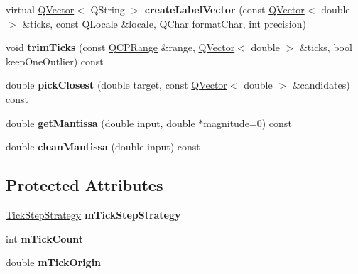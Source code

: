 \begin{DoxyCompactItemize}
virtual \hyperlink{class_q_vector}{Q\+Vector}$<$ Q\+String $>$ {\bfseries create\+Label\+Vector} (const \hyperlink{class_q_vector}{Q\+Vector}$<$ double $>$ \&ticks, const Q\+Locale \&locale, Q\+Char format\+Char, int precision)
\item 
\mbox{\label{class_q_c_p_axis_ticker_ab28cc1ab549489be7975f5ce7e717916}} 
void {\bfseries trim\+Ticks} (const \hyperlink{class_q_c_p_range}{Q\+C\+P\+Range} \&range, \hyperlink{class_q_vector}{Q\+Vector}$<$ double $>$ \&ticks, bool keep\+One\+Outlier) const
\item 
\mbox{\label{class_q_c_p_axis_ticker_a4ea0a7c4ca1c610f92b9bd5944ab4260}} 
double {\bfseries pick\+Closest} (double target, const \hyperlink{class_q_vector}{Q\+Vector}$<$ double $>$ \&candidates) const
\item 
\mbox{\label{class_q_c_p_axis_ticker_a2f1e223bafbf2cec7c3ba8b08d5c77e8}} 
double {\bfseries get\+Mantissa} (double input, double $\ast$magnitude=0) const
\item 
\mbox{\label{class_q_c_p_axis_ticker_ac7df6c72876b7abd67c932663a0b0f6a}} 
double {\bfseries clean\+Mantissa} (double input) const
\end{DoxyCompactItemize}
\subsection*{Protected Attributes}
\begin{DoxyCompactItemize}
\item 
\mbox{\label{class_q_c_p_axis_ticker_ac059d6d670b2f6132c593fb4de156701}} 
\hyperlink{class_q_c_p_axis_ticker_ab6d2f9d9477821623ac9bc4b21ddf49a}{Tick\+Step\+Strategy} {\bfseries m\+Tick\+Step\+Strategy}
\item 
\mbox{\label{class_q_c_p_axis_ticker_a14a35b47d1aad11b08d18ea0e25937b8}} 
int {\bfseries m\+Tick\+Count}
\item 
\mbox{\label{class_q_c_p_axis_ticker_a560ef9347b1aa599a9bf0e2f29d3ec16}} 
double {\bfseries m\+Tick\+Origin}
\end{DoxyCompactItemize}


